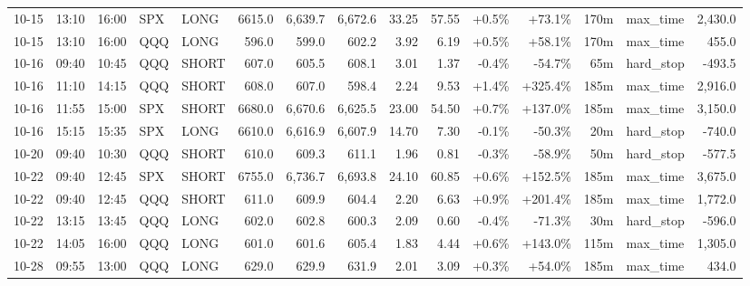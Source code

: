 \documentclass[11pt,a4paper,twoside]{article}
\begin{document}
\begin{landscape}
\begin{center}
\begin{longtable}{>{\color{txtmain}}l l l l l r r r r r r r r >{\color{txtmain}}l r}
10-15 & 13:10 & 16:00 & SPX & LONG & 6615.0 & 6,639.7 & 6,672.6 & 33.25 & 57.55 & \textcolor{wingreen}{+0.5\%} & \textcolor{wingreen}{+73.1\%} & 170m & max\_time & \textcolor{wingreen}{2,430.0} \\
10-15 & 13:10 & 16:00 & QQQ & LONG & 596.0 & 599.0 & 602.2 & 3.92 & 6.19 & \textcolor{wingreen}{+0.5\%} & \textcolor{wingreen}{+58.1\%} & 170m & max\_time & \textcolor{wingreen}{455.0} \\
10-16 & 09:40 & 10:45 & QQQ & SHORT & 607.0 & 605.5 & 608.1 & 3.01 & 1.37 & \textcolor{lossred}{-0.4\%} & \textcolor{lossred}{-54.7\%} & 65m & hard\_stop & \textcolor{lossred}{-493.5} \\
10-16 & 11:10 & 14:15 & QQQ & SHORT & 608.0 & 607.0 & 598.4 & 2.24 & 9.53 & \textcolor{wingreen}{+1.4\%} & \textcolor{wingreen}{+325.4\%} & 185m & max\_time & \textcolor{wingreen}{2,916.0} \\
10-16 & 11:55 & 15:00 & SPX & SHORT & 6680.0 & 6,670.6 & 6,625.5 & 23.00 & 54.50 & \textcolor{wingreen}{+0.7\%} & \textcolor{wingreen}{+137.0\%} & 185m & max\_time & \textcolor{wingreen}{3,150.0} \\
10-16 & 15:15 & 15:35 & SPX & LONG & 6610.0 & 6,616.9 & 6,607.9 & 14.70 & 7.30 & \textcolor{lossred}{-0.1\%} & \textcolor{lossred}{-50.3\%} & 20m & hard\_stop & \textcolor{lossred}{-740.0} \\
10-20 & 09:40 & 10:30 & QQQ & SHORT & 610.0 & 609.3 & 611.1 & 1.96 & 0.81 & \textcolor{lossred}{-0.3\%} & \textcolor{lossred}{-58.9\%} & 50m & hard\_stop & \textcolor{lossred}{-577.5} \\
10-22 & 09:40 & 12:45 & SPX & SHORT & 6755.0 & 6,736.7 & 6,693.8 & 24.10 & 60.85 & \textcolor{wingreen}{+0.6\%} & \textcolor{wingreen}{+152.5\%} & 185m & max\_time & \textcolor{wingreen}{3,675.0} \\
10-22 & 09:40 & 12:45 & QQQ & SHORT & 611.0 & 609.9 & 604.4 & 2.20 & 6.63 & \textcolor{wingreen}{+0.9\%} & \textcolor{wingreen}{+201.4\%} & 185m & max\_time & \textcolor{wingreen}{1,772.0} \\
10-22 & 13:15 & 13:45 & QQQ & LONG & 602.0 & 602.8 & 600.3 & 2.09 & 0.60 & \textcolor{lossred}{-0.4\%} & \textcolor{lossred}{-71.3\%} & 30m & hard\_stop & \textcolor{lossred}{-596.0} \\
10-22 & 14:05 & 16:00 & QQQ & LONG & 601.0 & 601.6 & 605.4 & 1.83 & 4.44 & \textcolor{wingreen}{+0.6\%} & \textcolor{wingreen}{+143.0\%} & 115m & max\_time & \textcolor{wingreen}{1,305.0} \\
10-28 & 09:55 & 13:00 & QQQ & LONG & 629.0 & 629.9 & 631.9 & 2.01 & 3.09 & \textcolor{wingreen}{+0.3\%} & \textcolor{wingreen}{+54.0\%} & 185m & max\_time & \textcolor{wingreen}{434.0} \\

\end{longtable}
\end{center}
\end{landscape}
\end{document}
